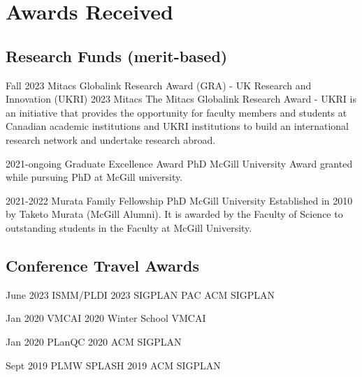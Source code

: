\section{Awards Received}

    \subsection{Research Funds (merit-based)}
    
    \cventry
        {Fall 2023}
        {Mitacs Globalink Research Award (GRA) - UK Research and Innovation (UKRI) 2023}
        {Mitacs}
        {}
        {}
        {
            The Mitacs Globalink Research Award - UKRI is an initiative that provides the opportunity for faculty members and students at Canadian academic institutions and UKRI institutions to build an international research network and undertake research abroad.
        }

    \cventry
        {2021-ongoing}
        {Graduate Excellence Award}
        {PhD}
        {McGill University}
        {}
        {Award granted while pursuing PhD at McGill university.}

    \cventry
        {2021-2022}
        {Murata Family Fellowship}
        {PhD}
        {McGill University}
        {}
        {
            Established in 2010 by Taketo Murata (McGill Alumni). 
            It is awarded by the Faculty of Science to outstanding students in the Faculty at McGill University.
        }

    \subsection{Conference Travel Awards}

    \cventry
        {June 2023}
        {ISMM/PLDI 2023 SIGPLAN PAC}
        {ACM SIGPLAN}
        {}
        {}
        {}

    \cventry
        {Jan 2020}
        {VMCAI 2020 Winter School}
        {VMCAI}
        {}
        {}
        {}
    
    \cventry
        {Jan 2020}
        {PLanQC 2020}
        {ACM SIGPLAN}
        {}
        {}
        {}

    \cventry
        {Sept 2019}
        {PLMW SPLASH 2019}
        {ACM SIGPLAN}
        {}
        {}
        {}

    
    
    